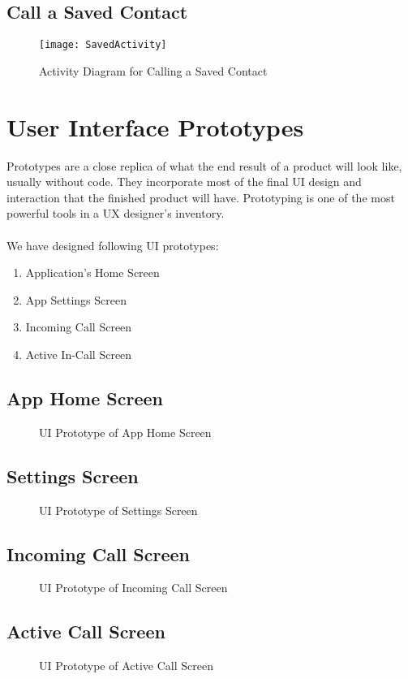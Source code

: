 \subsection{Call a Saved Contact}
\begin{figure}[H]
    \centering
    \texttt{[image: SavedActivity]}
    \caption{Activity Diagram for Calling a Saved Contact}
    \label{fig:saved_activity}
\end{figure}
\clearpage

\section{User Interface Prototypes}
Prototypes are a close replica of what the end result of a product will look like, usually without code. They incorporate most of the final UI design and interaction that the finished product will have. Prototyping is one of the most powerful tools in a UX designer's inventory.
\\ \\
We have designed following UI prototypes:
\begin{enumerate}
 \item Application's Home Screen
 \item App Settings Screen
 \item Incoming Call Screen
 \item Active In-Call Screen
\end{enumerate}

\subsection{App Home Screen}
\begin{figure}[H]
    \centering
    \caption{UI Prototype of App Home Screen}
    \label{fig:app_home}
\end{figure}

\subsection{Settings Screen}
\begin{figure}[H]
    \centering
    \caption{UI Prototype of Settings Screen}
    \label{fig:app_set}
\end{figure}

\subsection{Incoming Call Screen}
\begin{figure}[H]
    \centering
    \caption{UI Prototype of Incoming Call Screen}
    \label{fig:app_incoming}
\end{figure}

\subsection{Active Call Screen}
\begin{figure}[H]
    \centering
    \caption{UI Prototype of Active Call Screen}
    \label{fig:app_in_call}
\end{figure}
